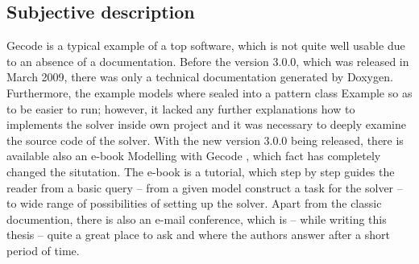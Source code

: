 \subsection{Subjective description}
Gecode is a typical example of a top software, which is not quite well usable due to
an absence of a documentation. Before the version 3.0.0, which was released in March 2009, there
was only a technical documentation generated by Doxygen. Furthermore, the example models where 
sealed into a pattern class Example so as to be easier to run; however, it lacked any further 
explanations how to implements the solver inside own project and it was necessary to deeply
examine the source code of the solver. With the new version 3.0.0 being released, there is
available also an e-book Modelling with Gecode \cite{gecode:modelling}, which fact has completely changed
the situtation. The e-book is a tutorial, which step by step guides the reader from a basic 
query -- from a given model construct a task for the solver -- to wide range of possibilities
of setting up the solver. Apart from the classic documention, there is also an e-mail conference,
which is -- while writing this thesis -- quite a great place to ask and where the authors
answer after a short period of time.
